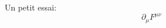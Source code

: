 \documentclass[10pt]{article}
\begin{document}
Un petit essai:
$$\partial_{\mu}F^{\mu\nu}$$
\end{document}
